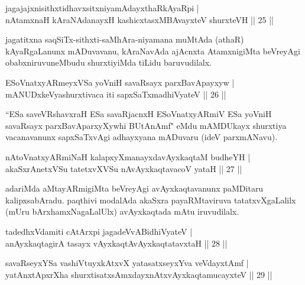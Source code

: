 
\begin{shl}
jagajajxnisithxtidhavxsitxniyamAdayxthaRkAyaRpi |\\
nA\s \s tamxnaH kAraNAdanayxH kashicxtasxMBAvayxteV shurxteVH \hfill || 25 ||
\end{shl}

\begin{artha}
jagatitxna saqSiTx-sithxti-saMhAra-niyamana muMtAda (athaR) kAyaRgaLanunx mADuvavanu, kAraNavAda ajAcnxta AtamxnigiMta beVreyAgi obabxniruvuneMbudu shurxtiyiMda tiLidu baruvudilalx.
\end{artha}


\begin{shl}
ESoV\s natxyARmeyxVSa yoVniH savaRsayx parxBavApayxyw |\\
mANUDxkeVyashurxtivaca iti sapxSaTxmadhiVyateV \hfill || 26 ||
\end{shl}

\begin{artha}
``ESa saveVRshavxraH ESa savaRjacnxH ESoV\s natxyARmiV ESa yoVniH savaRsayx parxBavAparxyXywhi BUtAnAmf" eMdu mAMDUkayx shurxtiya vacanavanunx sapxSaTxvAgi adhayxyana mADuvaru (ideV parxmANavu).
\end{artha}

\begin{shl}
nAtoV\s natxyARmiNaH kalapxyXmanayxdavAyxkaqtaM budheYH |\\
akaSxrAnetxVSu tatetxvXVSu nAvAyxkaqtavacoV yataH \hfill || 27 ||
\end{shl}

\begin{artha}
adariMda aMtayARmigiMta beVreyAgi avAyxkaqtavanunx paMDitaru kalipxsabAradu. paqthivi modalAda akaSxra payaRMtaviruva tatatxvXgaLalilx (mUru bArxhamxNagaLalUlx) avAyxkaqtada mAtu iruvudilalx.
\end{artha}

\begin{shl}
tadedhxVdamiti cAtArxpi jagadeVvABidhiVyateV |\\
anAyxkaqtagirA tasayx vAyxkaqtAvAyxkaqtatavxtaH \hfill || 28 ||
\end{shl}

\begin{shl}
savaRseyxYSa vashiVtuyxkAtxvX yatasatxseyxYva veVdayxtAmf |\\
yatAnxtApxrXha shurxtisatxsAmxdayxnAtx\s vAyxkaqtamucayxteV \hfill || 29 ||
\end{shl}

